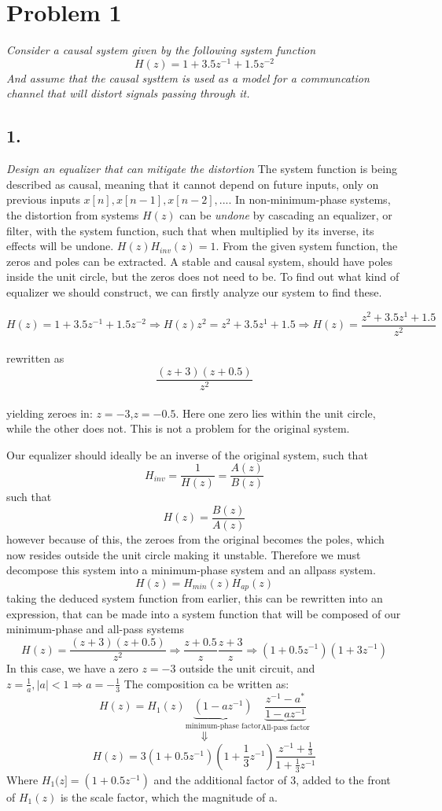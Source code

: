 \section{Problem 1}
\textit{Consider a causal system given by the following system function}
\[H(z) = 1 + 3.5z^{-1}+1.5z^{-2}\]
\textit{And assume that the causal systtem is used as a model for a communcation channel that will
distort signals passing through it.}

\subsection{1.}
\textit{Design an equalizer that can mitigate the distortion}
The system function is being described as causal, meaning that it cannot depend on future
inputs, only on previous inputs $x[n], x[n-1], x[n-2], ...$. In non-minimum-phase systems, the
distortion from systems $H(z)$ can be \textit{undone} by cascading an equalizer, or filter, with 
the system function, such that when multiplied by its inverse, its effects will be undone.
$H(z)H_{inv}(z) = 1$. %
From the given system function, the zeros and poles can be extracted. A stable and causal 
system, should have poles inside the unit circle, but the zeros does not need to be.
To find out what kind of equalizer we should construct, we can firstly analyze our system to
find these.

\[H(z) = 1 + 3.5z^{-1}+1.5z^{-2} \Rightarrow 
H(z)z^2 = z^2 + 3.5z^1 + 1.5 \Rightarrow
H(z) = \frac{z^2 + 3.5z^1 + 1.5}{z^2}\]\\
rewritten as \[\frac{(z+3)(z+0.5)}{z^2}\]\\
yielding zeroes in: $z=-3$,$z=-0.5$.
Here one zero lies within the unit circle, while the other does not.
This is not a problem for the original system.

Our equalizer should ideally be an inverse of the original system, such that 
\[H_{inv} = \frac{1}{H(z)} = \frac{A(z)}{B(z)}\] such that \[H(z) = \frac{B(z)}{A(z)}\]
however because of this, the zeroes from the original becomes the poles, which now resides outside
the unit circle making it unstable. Therefore we must decompose this system into a minimum-phase system
and an allpass system. 
\[H(z) = H_{min}(z)H_{ap}(z)\]
taking the deduced system function from earlier, this can be rewritten into an expression, 
that can be made into a system function that will be composed of our minimum-phase and all-pass systems
\[H(z) = \frac{(z+3)(z+0.5)}{z^2} \Rightarrow
\frac{z+0.5}{z} \frac{z+3}{z} \Rightarrow
(1+0.5z^{-1})(1+3z^{-1})\]
In this case, we have a zero $z=-3$ outside the unit circuit, and $z =\frac{1}{a}, |a|<1 \Rightarrow a = -\frac{1}{3}$
The composition ca be written as:
\[
H(z) = H_1(z)
\underbrace{(1-az^{-1})}_{\text{minimum-phase factor}}
\underbrace{
\frac{z^{-1}-a^*}{1-az^{-1}}
}_{\text{All-pass factor}}
\]
\[\Downarrow\]
\[
H(z) = 3(1+0.5z^{-1})
(1+\frac{1}{3}z^{-1})
\frac{z^{-1}+\frac{1}{3}}{1+\frac{1}{3}z^{-1}}
\]
Where $H_1(z] = (1+0.5z^{-1})$ and the additional factor of 3, added to the front of $H_1(z)$ 
is the scale factor, which the magnitude of a.

